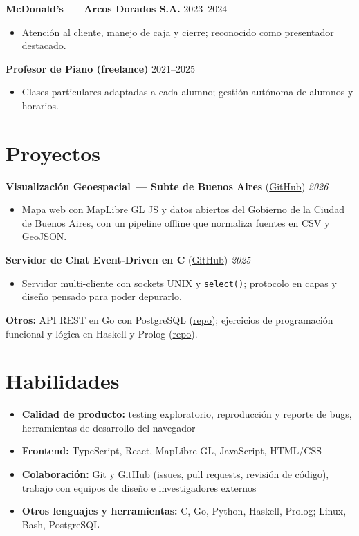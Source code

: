 \noindent \textbf{McDonald's~--- Arcos Dorados S.A.} \hfill 2023--2024
\begin{itemize}
  \item Atención al cliente, manejo de caja y cierre; reconocido como presentador destacado.
\end{itemize}

\noindent \textbf{Profesor de Piano (freelance)} \hfill 2021--2025
\begin{itemize}
  \item Clases particulares adaptadas a cada alumno; gestión autónoma de alumnos y horarios.
\end{itemize}

\section*{Proyectos}
\noindent \textbf{Visualización Geoespacial~--- Subte de Buenos Aires} (\href{https://github.com/Yarthax23/urbanly-subte-map}{GitHub}) \hfill \textit{2026}
\begin{itemize}
  \item Mapa web con MapLibre GL JS y datos abiertos del Gobierno de la Ciudad de Buenos Aires, con un
        pipeline offline que normaliza fuentes en CSV y GeoJSON.
\end{itemize}

\noindent \textbf{Servidor de Chat Event-Driven en C} (\href{https://github.com/Yarthax23/unix-chat-server}{GitHub}) \hfill \textit{2025}
\begin{itemize}
  \item Servidor multi-cliente con sockets UNIX y \texttt{select()}; protocolo en capas y diseño pensado para
        poder depurarlo.
\end{itemize}

\noindent \textbf{Otros:} API REST en Go con PostgreSQL
(\href{https://github.com/Yarthax23/go-todo-api}{repo}); ejercicios de programación funcional y lógica en
Haskell y Prolog (\href{https://github.com/juop12/Exactas-PLP-cNil}{repo}).

\section*{Habilidades}
\begin{itemize}
  \item \textbf{Calidad de producto:} testing exploratorio, reproducción y reporte de bugs, herramientas de desarrollo del navegador
  \item \textbf{Frontend:} TypeScript, React, MapLibre GL, JavaScript, HTML/CSS
  \item \textbf{Colaboración:} Git y GitHub (issues, pull requests, revisión de código), trabajo con equipos de diseño e investigadores externos
  \item \textbf{Otros lenguajes y herramientas:} C, Go, Python, Haskell, Prolog; Linux, Bash, PostgreSQL
\end{itemize}

